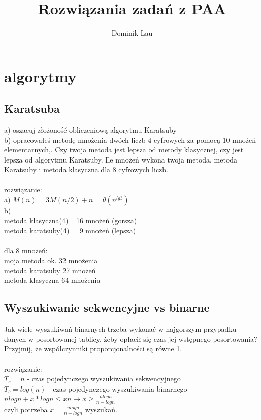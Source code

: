 \documentclass{article}
\title{Rozwiązania zadań z PAA}
\author{Dominik Lau}
\begin{document}
\maketitle

\section{algorytmy}
\subsection*{Karatsuba}
a) oszacuj złożoność obliczeniową algorytmu Karatsuby \\
b) opracowałeś metodę mnożenia dwóch liczb 4-cyfrowych za pomocą 10 mnożeń elementarnych,.
Czy twoja metoda jest  lepsza od metody klasycznej, czy jest lepsza od algorytmu Karatsuby.
Ile mnożeń wykona twoja metoda, metoda Karatsuby i metoda klasyczna dla 8 cyfrowych liczb. \\\\
rozwiązanie:\\
a) $M(n) = 3M(n/2) + n = \theta(n^{lg3})$ \\
b) \\
metoda klasyczna(4)= 16 mnożeń (gorsza) \\
metoda karatsuby(4) = 9 mnożeń  (lepsza) \\\\
dla 8 mnożeń: \\
moja metoda ok. 32 mnożenia \\
metoda karatsuby 27 mnożeń \\
metoda klasyczna 64 mnożenia 

\subsection*{Wyszukiwanie sekwencyjne vs binarne}
Jak wiele wyszukiwań binarnych trzeba wykonać w najgorszym przypadku danych w posortowanej tablicy, żeby opłacił się czas jej wstępnego posortowania?
Przyjmij, że współczynniki proporcjonalności są równe 1. \\\\rozwiązanie:\\
$T_s = n$ - czas pojedynczego wyszukiwania sekwencyjnego\\
$T_b = log(n)$ - czas pojedynczego wyszukiwania binarnego\\
$nlogn + x * logn \leq xn \rightarrow x \geq \frac{nlogn}{n-logn}$ \\
czyli potrzeba $x = \frac{nlogn}{n-logn}$ wyszukań.
\end{document}
